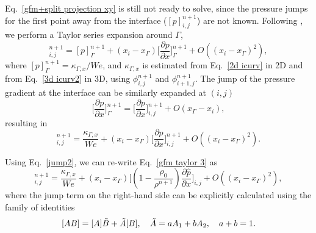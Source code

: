 Eq.\ \eqref{gfm+split projection xy} is still not ready to solve, since the pressure jumps for the first point away from the interface (\eg $[p]^{n+1}_{i,j}$) are not known. Following \cite{Desjardins_JCP_2008}, we perform a Taylor series expansion around $\Gamma$,
\begin{equation}
    [p]^{n+1}_{i,j} =  [p]^{n+1}_\Gamma + 
    (x_{i}-x_\Gamma)\bigg[\frac{\partial p}{\partial x} \bigg]^{n+1}_\Gamma +O((x_{i}- x_\Gamma)^2),
  \label{gfm taylor}
\end{equation}
where $[p]^{n+1}_\Gamma = \kappa_{\Gamma,x} /We$, and $\kappa_{\Gamma,x}$ is estimated from Eq.\ \eqref{2d icurv} in 2D and from Eq.\ \eqref{3d icurv2} in 3D,  using $\phi^{n+1}_{i,j}$ and $\phi^{n+1}_{i+1,j}$. The jump of the pressure gradient at the interface can be similarly expanded at $(i,j)$
\begin{equation}
    \bigg[\frac{\partial p}{\partial x} \bigg]^{n+1}_\Gamma = 
    \bigg[\frac{\partial p}{\partial x} \bigg]^{n+1}_{i,j} +O(x_\Gamma -x_{i}),
  \label{gfm taylor 2}
\end{equation}
resulting in
\begin{equation}
    [p]^{n+1}_{i,j} =  \frac{\kappa_{\Gamma,x}}{We} + 
    (x_{i}-x_\Gamma)\bigg[\frac{\partial p}{\partial x} \bigg]^{n+1}_{i,j} +O((x_{i}- x_\Gamma)^2).
  \label{gfm taylor 3}
\end{equation}

Using Eq.\ \eqref{jump2}, we can re-write Eq.\ \eqref{gfm taylor 3} as
\begin{equation}
    [p]^{n+1}_{i,j} =  \frac{\kappa_{\Gamma,x}}{We} + (x_{i}-x_\Gamma) 
    \bigg[ (1-\frac{\rho_0}{\rho^{n+1}}) \frac{\partial \hat{p}}{\partial x} \bigg]_{i,j} +O((x_{i}- x_\Gamma)^2),
  \label{gfm taylor 4}
\end{equation}
where the jump term on the right-hand side can be explicitly calculated using the family of identities 
\begin{equation}
    \textcolor{black}{[AB]=[A]\tilde{B}+\tilde{A}[B],\quad \tilde{A}=aA_1+bA_2,\quad a+b=1.}
  \label{jump identity}
\end{equation}

%
%


